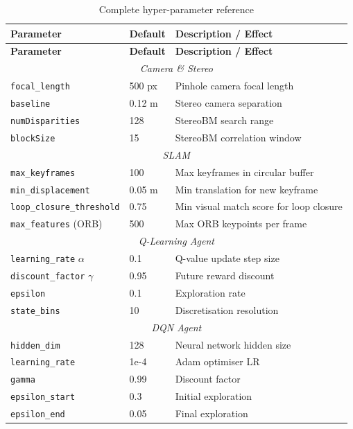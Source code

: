 \documentclass[12pt,a4paper,twoside]{report}
\theoremstyle{definition}
\newcommand{\code}[1]{\texttt{#1}}
\begin{document}
\begin{longtable}{|p{4.5cm}|p{2.5cm}|p{6.5cm}|}
\caption{Complete hyper-parameter reference}\label{tab:hyperparams}\\
\hline
\textbf{Parameter} & \textbf{Default} & \textbf{Description / Effect} \\ \hline
\endfirsthead
\hline
\textbf{Parameter} & \textbf{Default} & \textbf{Description / Effect} \\ \hline
\endhead
\multicolumn{3}{c}{\textit{Camera \& Stereo}} \\ \hline
\code{focal\_length} & 500 px & Pinhole camera focal length \\ \hline
\code{baseline} & 0.12 m & Stereo camera separation \\ \hline
\code{numDisparities} & 128 & StereoBM search range \\ \hline
\code{blockSize} & 15 & StereoBM correlation window \\ \hline
\multicolumn{3}{c}{\textit{SLAM}} \\ \hline
\code{max\_keyframes} & 100 & Max keyframes in circular buffer \\ \hline
\code{min\_displacement} & 0.05 m & Min translation for new keyframe \\ \hline
\code{loop\_closure\_threshold} & 0.75 & Min visual match score for loop closure \\ \hline
\code{max\_features} (ORB) & 500 & Max ORB keypoints per frame \\ \hline
\multicolumn{3}{c}{\textit{Q-Learning Agent}} \\ \hline
\code{learning\_rate} $\alpha$ & 0.1 & Q-value update step size \\ \hline
\code{discount\_factor} $\gamma$ & 0.95 & Future reward discount \\ \hline
\code{epsilon} & 0.1 & Exploration rate \\ \hline
\code{state\_bins} & 10 & Discretisation resolution \\ \hline
\multicolumn{3}{c}{\textit{DQN Agent}} \\ \hline
\code{hidden\_dim} & 128 & Neural network hidden size \\ \hline
\code{learning\_rate} & 1e-4 & Adam optimiser LR \\ \hline
\code{gamma} & 0.99 & Discount factor \\ \hline
\code{epsilon\_start} & 0.3 & Initial exploration \\ \hline
\code{epsilon\_end} & 0.05 & Final exploration \\ \hline

\end{longtable}
\end{document}
